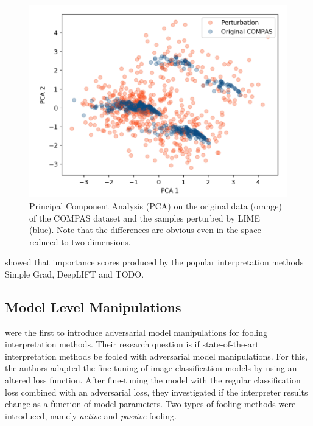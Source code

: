 \begin{figure}[ht]
    \centering
    \includegraphics[width=\linewidth]{figures/slack_ood_data.png}
    \caption{Principal Component Analysis (PCA) on the original data (orange) of the COMPAS dataset and the samples perturbed by LIME (blue). Note that the differences are obvious even in the space reduced to two dimensions.}
    \label{fig:slack_ood_data}
    \vspace{-0.3cm}
\end{figure}

\cite{ghorbani2019interpretation} showed that importance scores produced by the popular interpretation methods Simple Grad, DeepLIFT and TODO. 



\subsection{Model Level Manipulations}

\cite{fooling_nn_interpreters} were the first to introduce adversarial model manipulations for fooling interpretation methods. 
Their research question is if state-of-the-art interpretation methods be fooled with adversarial model manipulations. For this, the authors adapted the fine-tuning of image-classification models by using an altered loss function. 
After fine-tuning the model with the regular classification loss combined with an adversarial loss, they investigated if the interpreter results change as a function of model parameters. 
Two types of fooling methods were introduced, namely \textit{active} and \textit{passive} fooling. 

